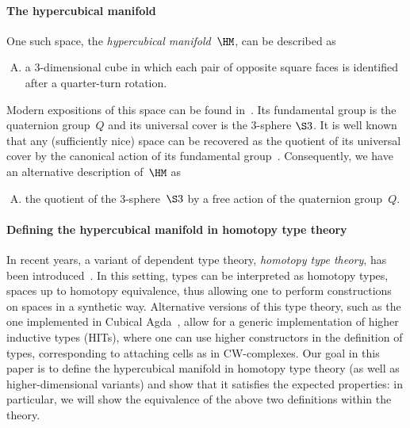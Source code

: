 \documentclass[a4paper]{article}
\newcommand{\citep}{\cite}
\begin{document}
\paragraph{The hypercubical manifold}
One such space, the \emph{hypercubical manifold}~$\HM$, can be described as

\begin{enumerate}[(A)]
\item\label{hm-def-cw} a 3-dimensional cube in which each pair of opposite square faces is identified after a quarter-turn rotation.
\end{enumerate}

\noindent
Modern expositions of this space can be found in~\citep{hypercubique,sarem}. Its fundamental group is the quaternion group~$Q$ and its universal cover is the 3-sphere $\S3$. It is well known that any (sufficiently nice) space can be recovered as the quotient of its universal cover by the canonical action of its fundamental group~\cite[Proposition 1.40]{hatcher}. Consequently, we have an alternative description of~$\HM$ as

\begin{enumerate}[(A),resume]
\item\label{hm-def-quotient} the quotient of the 3-sphere $\S3$ by a free action of the quaternion group~$Q$.
\end{enumerate}

\paragraph{Defining the hypercubical manifold in homotopy type theory}
In recent years, a variant of dependent type theory, \emph{homotopy type theory}, has been introduced~\citep{hottbook}. In this setting, types can be interpreted as homotopy types, \ie spaces up to homotopy equivalence, thus allowing one to perform constructions on spaces in a synthetic way. Alternative versions of this type theory, such as the one implemented in Cubical Agda~\citep{vezzosi2021cubical}, allow for a generic implementation of higher inductive types (HITs), where one can use higher constructors in the definition of types, corresponding to attaching cells as in CW-complexes. Our goal in this paper is to define the hypercubical manifold in homotopy type theory (as well as higher-dimensional variants) and show that it satisfies the expected properties: in particular, we will show the equivalence of the above two definitions within the theory.
\end{document}
